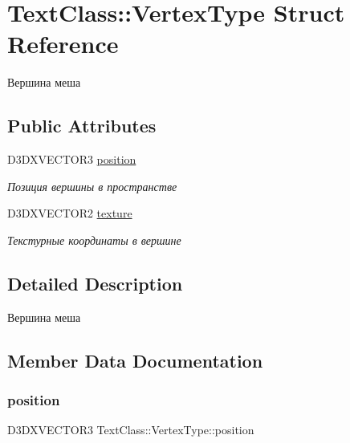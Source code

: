 \hypertarget{struct_text_class_1_1_vertex_type}{}\section{Text\+Class\+:\+:Vertex\+Type Struct Reference}
\label{struct_text_class_1_1_vertex_type}


Вершина меша  


\subsection*{Public Attributes}
\begin{DoxyCompactItemize}
\item 
D3\+D\+X\+V\+E\+C\+T\+O\+R3 \hyperlink{struct_text_class_1_1_vertex_type_a14e31ed7d5d33692221b2e2f2e3999b3}{position}
\begin{DoxyCompactList}\small\item\em Позиция вершины в пространстве \end{DoxyCompactList}\item 
D3\+D\+X\+V\+E\+C\+T\+O\+R2 \hyperlink{struct_text_class_1_1_vertex_type_aa83b5963fa9226034bfda27b2b37766b}{texture}
\begin{DoxyCompactList}\small\item\em Текстурные координаты в вершине \end{DoxyCompactList}\end{DoxyCompactItemize}


\subsection{Detailed Description}
Вершина меша 

\subsection{Member Data Documentation}
\mbox{\label{struct_text_class_1_1_vertex_type_a14e31ed7d5d33692221b2e2f2e3999b3}} 
\subsubsection{\texorpdfstring{position}{position}}
{\footnotesize\ttfamily D3\+D\+X\+V\+E\+C\+T\+O\+R3 Text\+Class\+::\+Vertex\+Type\+::position}



